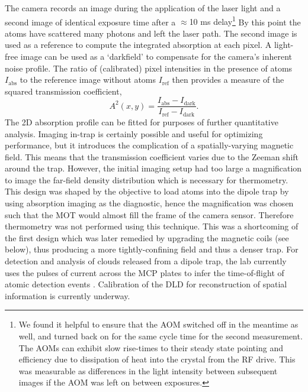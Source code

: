 	The camera records an image during the application of the laser light and a second image of identical exposure time after a {$\approx$10 ms delay}\footnote{We found it helpful to ensure that the AOM switched off in the meantime as well, and turned back on for the same cycle time for the second measurement.
	The AOMs can exhibit slow rise-times to their steady state pointing and efficiency due to dissipation of heat into the crystal from the RF drive.
	This was measurable as differences in the light intensity between subsequent images if the AOM was left on between exposures.}
	By this point the atoms have scattered many photons and left the laser path.
	The second image is used as a reference to compute the integrated absorption at each pixel.
	A light-free image can be used as a `darkfield' to compensate for the camera's inherent noise profile.
	The ratio of (calibrated) pixel intensities in the presence of atoms $I_\textrm{abs}$ to the reference image without atoms $I_\textrm{ref}$ then provides a measure of the squared transmission coefficient,
	\begin{equation}
	A^2(x,y)=\frac{I_\textrm{abs}-I_\textrm{dark}}{I_\textrm{ref}-I_\textrm{dark}}.
	\end{equation}
	The 2D absorption profile can be fitted for purposes of further quantitative analysis. 
	Imaging in-trap is certainly possible and useful for optimizing performance, but it introduces the complication of a spatially-varying magnetic field.
	This means that the transmission coefficient varies due to the Zeeman shift around the trap.
	However, the initial imaging setup had too large a magnification to image the far-field density distribution which is necessary for thermometry.
	This design was shaped by the objective to load atoms into the dipole trap by using absorption imaging as the diagnostic, hence the magnification was chosen such that the MOT would almost fill the frame of the camera sensor.
	Therefore thermometry was not performed using this technique. 
	This was a shortcoming of the first design which was later remedied by upgrading the magnetic coils (see below), thus producing a more tightly-confining field and thus a denser trap.
	For detection and analysis of clouds released from a dipole trap, the lab currently uses the pulses of current across the MCP plates to infer the time-of-flight of atomic detection events \cite{Abbas21}.
	Calibration of the DLD for reconstruction of spatial information is currently underway.


